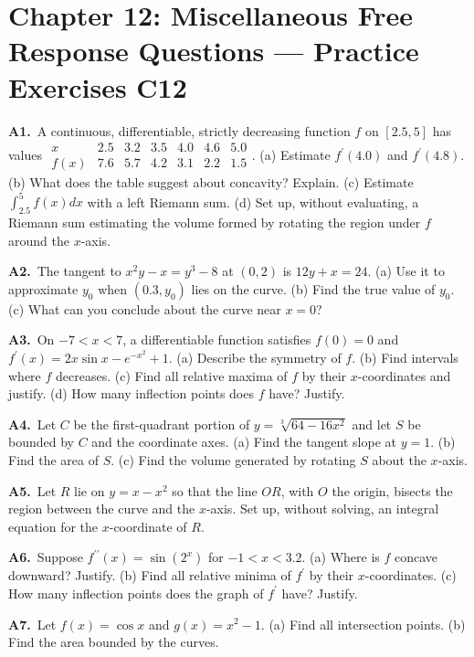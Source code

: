 \documentclass[11pt]{article}
\begin{document}
\section*{Chapter 12: Miscellaneous Free Response Questions --- Practice Exercises C12}

\bigskip\noindent\textbf{A1.}\ A continuous, differentiable, strictly decreasing function $f$ on $[2.5,5]$ has values $\begin{array}{c|rrrrrr}x&2.5&3.2&3.5&4.0&4.6&5.0\\f(x)&7.6&5.7&4.2&3.1&2.2&1.5\end{array}$. (a) Estimate $f^{\prime}(4.0)$ and $f^{\prime}(4.8)$. (b) What does the table suggest about concavity? Explain. (c) Estimate $\int_{2.5}^5f(x)dx$ with a left Riemann sum. (d) Set up, without evaluating, a Riemann sum estimating the volume formed by rotating the region under $f$ around the $x$-axis.

\bigskip\noindent\textbf{A2.}\ The tangent to $x^2y-x=y^3-8$ at $(0,2)$ is $12y+x=24$. (a) Use it to approximate $y_0$ when $(0.3,y_0)$ lies on the curve. (b) Find the true value of $y_0$. (c) What can you conclude about the curve near $x=0$?

\bigskip\noindent\textbf{A3.}\ On $-7<x<7$, a differentiable function satisfies $f(0)=0$ and $f^{\prime}(x)=2x\sin x-e^{-x^2}+1$. (a) Describe the symmetry of $f$. (b) Find intervals where $f$ decreases. (c) Find all relative maxima of $f$ by their $x$-coordinates and justify. (d) How many inflection points does $f$ have? Justify.

\bigskip\noindent\textbf{A4.}\ Let $C$ be the first-quadrant portion of $y=\sqrt[3]{64-16x^2}$ and let $S$ be bounded by $C$ and the coordinate axes. (a) Find the tangent slope at $y=1$. (b) Find the area of $S$. (c) Find the volume generated by rotating $S$ about the $x$-axis.

\bigskip\noindent\textbf{A5.}\ Let $R$ lie on $y=x-x^2$ so that the line $OR$, with $O$ the origin, bisects the region between the curve and the $x$-axis. Set up, without solving, an integral equation for the $x$-coordinate of $R$.

\bigskip\noindent\textbf{A6.}\ Suppose $f^{\prime\prime}(x)=\sin(2^x)$ for $-1<x<3.2$. (a) Where is $f$ concave downward? Justify. (b) Find all relative minima of $f^{\prime}$ by their $x$-coordinates. (c) How many inflection points does the graph of $f^{\prime}$ have? Justify.

\bigskip\noindent\textbf{A7.}\ Let $f(x)=\cos x$ and $g(x)=x^2-1$. (a) Find all intersection points. (b) Find the area bounded by the curves.
\end{document}
